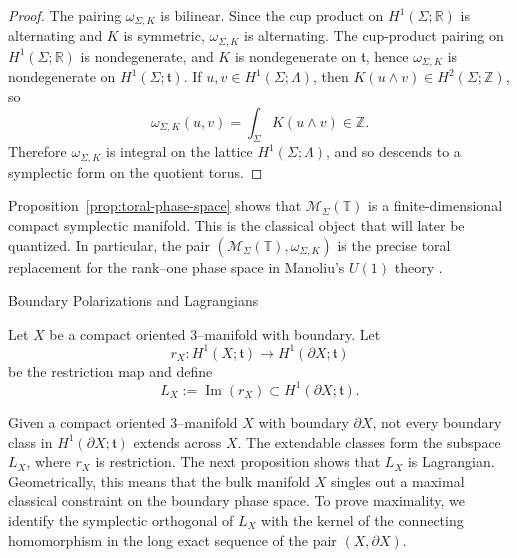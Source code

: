 \documentclass[12pt]{amsart}
\makeatletter
\renewcommand\subsection{\@startsection{subsection}{2}%
  \z@{.5\linespacing\@plus.7\linespacing}{-.5em}%
  {\normalfont\bfseries}}
\numberwithin{equation}{section}
\makeatother
\begin{document}
\begin{proof}
The pairing \(\omega_{\Sigma,K}\) is bilinear. Since the cup product on
\(H^1(\Sigma;\mathbb R)\) is alternating and \(K\) is symmetric,
\(\omega_{\Sigma,K}\) is alternating. The cup-product pairing on
\(H^1(\Sigma;\mathbb R)\) is nondegenerate, and \(K\) is nondegenerate on
\(\mathfrak t\), hence \(\omega_{\Sigma,K}\) is nondegenerate on \(H^1(\Sigma;\mathfrak t)\). If \(u,v\in H^1(\Sigma;\Lambda)\), then \(K(u\wedge v)\in H^2(\Sigma;\mathbb Z)\), so
\[
\omega_{\Sigma,K}(u,v)=\int_\Sigma K(u\wedge v)\in\mathbb Z.
\]
Therefore \(\omega_{\Sigma,K}\) is integral on the lattice \(H^1(\Sigma;\Lambda)\),
and so descends to a symplectic form on the quotient torus.
\end{proof}



Proposition~\ref{prop:toral-phase-space} shows that
\(\mathcal M_\Sigma(\mathbb T)\) is a finite-dimensional compact symplectic manifold. This is the classical object that will later be
quantized. In particular, the pair
\((\mathcal M_\Sigma(\mathbb T),\omega_{\Sigma,K})\) is the precise toral
replacement for the rank--one phase space in Manoliu's \(U(1)\) theory \cite{Manoliu1}.


\subsection{Boundary Polarizations and Lagrangians}

Let \(X\) be a compact oriented \(3\)--manifold with boundary. Let
\begin{equation}
r_X:H^1(X;\mathfrak t)\longrightarrow H^1(\partial X;\mathfrak t)
\end{equation}
be the restriction map and define
\begin{equation}
L_X:=\operatorname{Im}(r_X)\subset H^1(\partial X;\mathfrak t).
\end{equation}

Given a compact oriented \(3\)--manifold \(X\) with boundary \(\partial X\), not
every boundary class in \(H^1(\partial X;\mathfrak t)\) extends across \(X\).
The extendable classes form the subspace
\(L_X\), where
\(r_X\) is restriction. The
next proposition shows that \(L_X\) is Lagrangian. Geometrically, this means
that the bulk manifold \(X\) singles out a maximal classical constraint on the boundary phase space. To prove maximality, we identify the symplectic orthogonal of $L_X$ with the kernel of the connecting
homomorphism in the long exact sequence of the pair $(X,\partial X)$.
\end{document}
